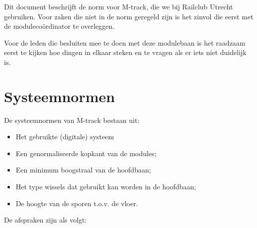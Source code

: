 \documentclass[12pt,a4paper]{report}
\begin{document}
Dit document beschrijft de norm voor M-track, die we bij Railclub Utrecht gebruiken. Voor zaken die niet in de norm geregeld zijn is het zinvol die eerst met de moduleco\"{o}rdinator te overleggen.

Voor de leden die besluiten mee te doen met deze modulebaan is het raadzaam eerst te kijken hoe dingen in elkaar steken en te vragen als er iets niet duidelijk is.

\section{Systeemnormen}

De systeemnormen van M-track bestaan uit:
\begin{itemize}
\item Het gebruikte (digitale) systeem
\item Een genormaliseerde kopkant van de modules;
\item Een minimum boogstraal van de hoofdbaan;
\item Het type wissels dat gebruikt kan worden in de hoofdbaan;
\item De hoogte van de sporen t.o.v. de vloer.
\end{itemize}

De afspraken zijn als volgt:
\end{document}
